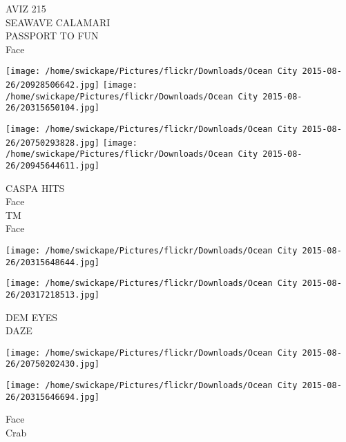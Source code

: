 \documentclass[10pt,letterpaper]{article}
\begin{document}
AVIZ 215\\
SEAWAVE CALAMARI\\
PASSPORT TO FUN\\
Face
\pagebreak

\texttt{[image: /home/swickape/Pictures/flickr/Downloads/Ocean City 2015-08-26/20928506642.jpg]}
\texttt{[image: /home/swickape/Pictures/flickr/Downloads/Ocean City 2015-08-26/20315650104.jpg]}

\texttt{[image: /home/swickape/Pictures/flickr/Downloads/Ocean City 2015-08-26/20750293828.jpg]}
\texttt{[image: /home/swickape/Pictures/flickr/Downloads/Ocean City 2015-08-26/20945644611.jpg]}

CASPA HITS\\
Face\\
TM\\
Face
\pagebreak

\texttt{[image: /home/swickape/Pictures/flickr/Downloads/Ocean City 2015-08-26/20315648644.jpg]}

\vspace{0.25in}
\texttt{[image: /home/swickape/Pictures/flickr/Downloads/Ocean City 2015-08-26/20317218513.jpg]}

DEM EYES\\
DAZE
\pagebreak

\texttt{[image: /home/swickape/Pictures/flickr/Downloads/Ocean City 2015-08-26/20750202430.jpg]}

\vspace{0.25in}
\texttt{[image: /home/swickape/Pictures/flickr/Downloads/Ocean City 2015-08-26/20315646694.jpg]}

Face\\
Crab
\pagebreak
\end{document}
